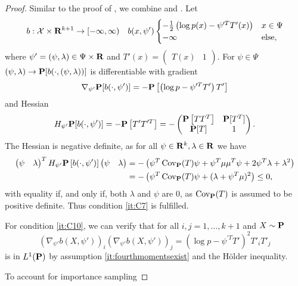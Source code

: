 \begin{proof}
    Similar to the proof of , we combine  and . Let 
    \begin{align*}
        b : \mathcal X \times \R^{k + 1} \to [-\infty, \infty) && b(x, \psi') \begin{cases}
            -\frac{1}{2} \left( \log p(x) - \psi^{\prime T}T'(x) \right) & x \in \Psi \\
            -\infty & \text{else,}
        \end{cases}
    \end{align*}
    where $\psi' = (\psi, \lambda) \in \Psi \times\R$ and $T'(x) = \begin{pmatrix} T(x) & 1 \end{pmatrix}$. For $\psi \in \Psi$ $(\psi, \lambda) \to \P [b(\cdot, (\psi, \lambda))]$ is differentiable with gradient 
    $$
        \nabla_{\psi'} \P [b(\cdot, \psi')] = - \P \left[\left( \log p - \psi^{\prime T}T' \right) T'\right]
    $$
    and Hessian 
    $$
        H_{\psi'} \P[b(\cdot, \psi')] = -\P\left[T'T^{\prime T}\right] = - \begin{pmatrix}
            \P \left[ TT^{T} \right] & \P [T^{T}] \\
            \P [T] & 1
        \end{pmatrix}.
    $$
    The Hessian is negative definite, as for all $\psi\in \R^{k}, \lambda \in \R$ we have
    \begin{align*}
        \begin{pmatrix} \psi & \lambda \end{pmatrix}^{T} H_{\psi'} \P \left[ b(\cdot, \psi') \right]\begin{pmatrix} \psi & \lambda \end{pmatrix} &= - \left( \psi^{T} \cov_{\P} (T) \psi + \psi^{T}\mu\mu^{T}\psi + 2 \psi^{T} \lambda + \lambda^{2}\right) \\
        &= - \left( \psi^{T}\cov_{\P}(T)\psi + (\lambda + \psi^{T}\mu)^{2} \right) \leq 0,
    \end{align*}
    with equality if, and only if, both $\lambda$ and $\psi$ are $0$, as $\cov_{\P}(T)$ is assumed to be positive definite. Thus condition \ref{it:C7} is fulfilled.

    For condition \ref{it:C10}, we can verify that for all $i,j = 1,\dots, k+ 1$ and $X \sim \P$
    $$
        (\nabla_{\psi'} b(X, \psi'))_{i}(\nabla_{\psi'} b(X, \psi'))_{j} = \left( \log p - \psi^{\prime T}T' \right)^{2} T'_{i}T'_{j}
    $$
    is in $L^{1}(\P)$ by assumption \ref{it:fourthmomentsexist} and the Hölder inequality. 

    To account for importance sampling
    
\end{proof}

